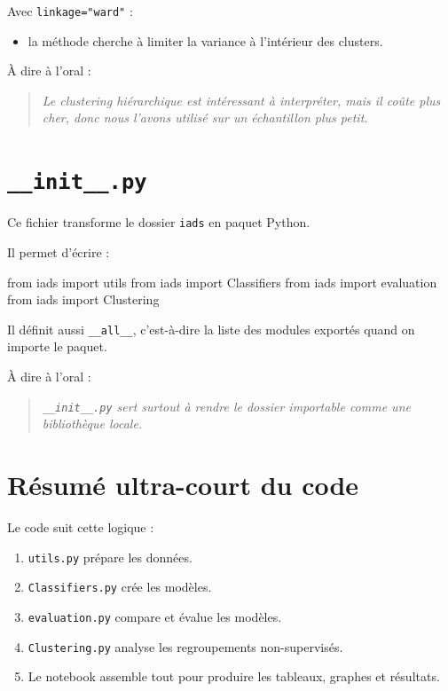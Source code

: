 \documentclass[11pt,a4paper]{article}
\begin{document}
Avec \texttt{linkage="ward"} :

\begin{itemize}
\item la méthode cherche à limiter la variance à l'intérieur des clusters.
\end{itemize}

À dire à l'oral :

\begin{quote}
\itshape Le clustering hiérarchique est intéressant à interpréter, mais il coûte plus cher, donc nous l'avons utilisé sur un échantillon plus petit.
\end{quote}

\section{\texttt{\_\_init\_\_.py}}

Ce fichier transforme le dossier \texttt{iads} en paquet Python.

Il permet d'écrire :

\begin{codeblock}
from iads import utils
from iads import Classifiers
from iads import evaluation
from iads import Clustering
\end{codeblock}

Il définit aussi \texttt{\_\_all\_\_}, c'est-à-dire la liste des modules exportés quand on importe le paquet.

À dire à l'oral :

\begin{quote}
\itshape \texttt{\_\_init\_\_.py} sert surtout à rendre le dossier importable comme une bibliothèque locale.
\end{quote}

\section{Résumé ultra-court du code}

Le code suit cette logique :

\begin{enumerate}
\item \texttt{utils.py} prépare les données.
\item \texttt{Classifiers.py} crée les modèles.
\item \texttt{evaluation.py} compare et évalue les modèles.
\item \texttt{Clustering.py} analyse les regroupements non-supervisés.
\item Le notebook assemble tout pour produire les tableaux, graphes et résultats.
\end{enumerate}
\end{document}
